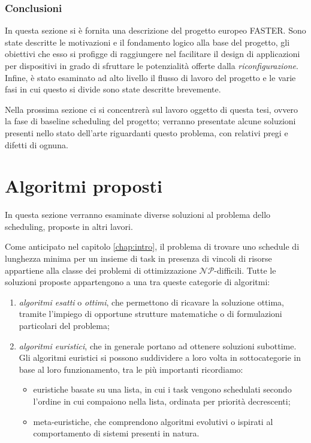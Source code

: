\subsubsection{Conclusioni}
In questa sezione si è fornita una descrizione del progetto europeo 
\ac{FASTER}. Sono state descritte le motivazioni e il fondamento logico alla 
base del progetto, gli obiettivi che esso si profigge di raggiungere nel 
facilitare il design di applicazioni per dispositivi in grado di sfruttare le 
potenzialità offerte dalla \emph{riconfigurazione}. Infine, è stato esaminato 
ad alto livello il flusso di lavoro del progetto e le varie fasi in cui questo 
si divide sono state descritte brevemente.

Nella prossima sezione ci si concentrerà sul lavoro oggetto di questa tesi, 
ovvero la fase di baseline scheduling del progetto; verranno presentate alcune 
soluzioni presenti nello stato dell'arte riguardanti questo problema, con 
relativi pregi e difetti di ognuna.


\section{Algoritmi proposti}
\label{sec:algoritmiProposti}
In questa sezione verranno esaminate diverse soluzioni al problema dello 
scheduling, proposte in altri lavori.

Come anticipato nel capitolo \ref{chap:intro}, il problema di trovare uno 
schedule di lunghezza minima per un insieme di task in presenza di vincoli di 
risorse appartiene alla classe dei problemi di ottimizzazione 
$\mathcal{NP}$-difficili. Tutte le soluzioni proposte appartengono a una 
tra queste categorie di algoritmi:
\begin{enumerate}
 \item \emph{algoritmi esatti} o \emph{ottimi}, che permettono di ricavare la 
soluzione ottima, tramite l'impiego di opportune strutture matematiche o di 
formulazioni particolari del problema;
 \item \emph{algoritmi euristici}, che in generale portano ad ottenere 
soluzioni subottime. Gli algoritmi euristici si possono suddividere a loro 
volta in sottocategorie in base al loro funzionamento, tra le più importanti 
ricordiamo:
 \begin{itemize}
  \item euristiche basate su una lista, in cui i task vengono schedulati 
secondo l'ordine in cui compaiono nella lista, ordinata per priorità decrescenti;
  \item meta-euristiche, che comprendono algoritmi evolutivi o ispirati al 
comportamento di sistemi presenti in natura.
 \end{itemize}
\end{enumerate}

